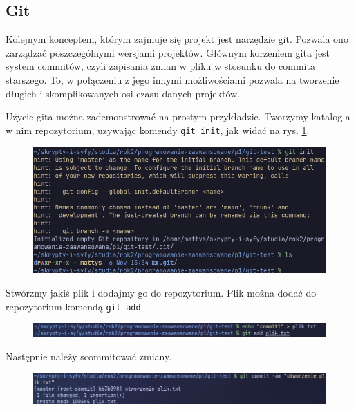 \subsection{Git}
Kolejnym konceptem, którym zajmuje się projekt jest narzędzie git\cite{gitsite}. Pozwala ono zarządzać poszczególnymi wersjami projektów. Głównym korzeniem gita jest system commitów, czyli zapisania zmian w pliku w stosunku do commita starszego. To, w połączeniu z jego innymi możliwościami pozwala na tworzenie długich i skomplikowanych osi czasu danych projektów. 

Użycie gita można zademonstrować na prostym przykładzie. Tworzymy katalog a w nim repozytorium, uzywając komendy \texttt{git init}, jak widać na rys. \ref{fig:git_init}.

\begin{figure}[H]
	\centering
	\includegraphics[width=1\textwidth]{images/git_init.png}
	\caption{}
	\label{fig:git_init}
\end{figure}

Stwórzmy jakiś plik i dodajmy go do repozytorium. Plik można dodać do repozytorium komendą \texttt{git add}

\begin{figure}[H]
	\centering
	\includegraphics[width=1\textwidth]{images/git_add.png}
	\caption{}
	\label{fig:git_add}
\end{figure}

Następnie należy scommitować zmiany. 

\begin{figure}[H]
	\centering
	\includegraphics[width=1\textwidth]{images/git_commit1.png}
	\caption{}
	\label{fig:git_commit1}
\end{figure}

